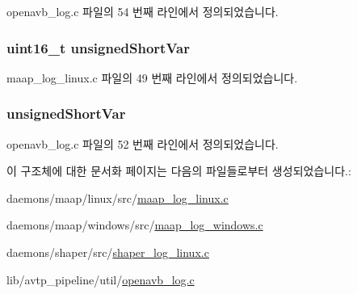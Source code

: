 openavb\+\_\+log.\+c 파일의 54 번째 라인에서 정의되었습니다.

\subsubsection[{\texorpdfstring{unsigned\+Short\+Var}{unsignedShortVar}}]{\setlength{\rightskip}{0pt plus 5cm}uint16\+\_\+t unsigned\+Short\+Var}\hypertarget{structlog__rt__queue__item__t_a5ff4647f0732e05863c136edfe1ae337}{}\label{structlog__rt__queue__item__t_a5ff4647f0732e05863c136edfe1ae337}


maap\+\_\+log\+\_\+linux.\+c 파일의 49 번째 라인에서 정의되었습니다.

\subsubsection[{\texorpdfstring{unsigned\+Short\+Var}{unsignedShortVar}}]{ unsigned\+Short\+Var}\hypertarget{structlog__rt__queue__item__t_a2198c1c7f1d16fcf744aa8006bc18656}{}\label{structlog__rt__queue__item__t_a2198c1c7f1d16fcf744aa8006bc18656}


openavb\+\_\+log.\+c 파일의 52 번째 라인에서 정의되었습니다.



이 구조체에 대한 문서화 페이지는 다음의 파일들로부터 생성되었습니다.\+:\begin{DoxyCompactItemize}
\item 
daemons/maap/linux/src/\hyperlink{maap__log__linux_8c}{maap\+\_\+log\+\_\+linux.\+c}\item 
daemons/maap/windows/src/\hyperlink{maap__log__windows_8c}{maap\+\_\+log\+\_\+windows.\+c}\item 
daemons/shaper/src/\hyperlink{shaper__log__linux_8c}{shaper\+\_\+log\+\_\+linux.\+c}\item 
lib/avtp\+\_\+pipeline/util/\hyperlink{openavb__log_8c}{openavb\+\_\+log.\+c}\end{DoxyCompactItemize}
